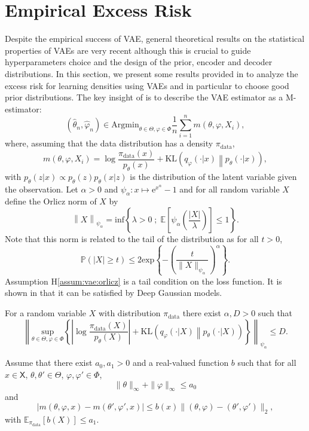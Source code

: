 \documentclass[english,graybox,envcountchap,envcountsame,sectrefs,shortlabels]{svmono}
\theoremstyle{style}
\newcommand{\rme}{\mathrm{e}}
\newcommand{\eqsp}{}
\begin{document}
\section{Empirical Excess Risk}
Despite the empirical success of VAE, general theoretical results on the statistical properties of VAEs are very recent although this is crucial to guide hyperparameters choice and the design of the prior, encoder and decoder distributions. In this section, we present some results provided in \cite{pmlr-v134-tang21a} to analyze the excess risk for learning densities using VAEs and in particular to choose good prior distributions.  The key insight of \cite{pmlr-v134-tang21a} is to describe the VAE estimator as a M-estimator:
$$
(\widehat\theta_n,\widehat\varphi_n) \in\mathrm{Argmin}_{\theta\in\Theta,\varphi\in\Phi} \frac{1}{n}\sum_{i=1}^n m(\theta,\varphi,X_i)\eqsp,
$$
where, assuming that the data distribution has a density $\pi_{\mathrm{data}}$, 
$$
m(\theta,\varphi,X_i) = \log \frac{\pi_{\mathrm{data}}(x)}{p_\theta(x)} + \mathrm{KL}\left(q_\varphi(\cdot|x)\middle\|p_\theta(\cdot|x)\right)\eqsp,
$$
with $p_\theta(z|x) \propto p_\theta(z)p_\theta(x|z)$ is the distribution of the latent variable given the observation. Let $\alpha>0$ and $\psi_\alpha: x\mapsto \rme^{x^\alpha}-1$ and for all random variable $X$ define the Orlicz norm of $X$ by
$$
\left\|X\right\|_{\psi_{\alpha}} = \mathrm{inf}\left\{\lambda >0\;;\; \mathbb{E}\left[\psi_\alpha\left(\frac{|X|}{\lambda}\right)\right]\leqslant 1\right\}\eqsp.
$$
Note that this norm is related to the tail of the distribution as for all $t>0$,
$$
\mathbb{P}\left(|X|\geqslant t\right)\leqslant 2\mathrm{exp}\left\{-\left(\frac{t}{\|X\|_{\psi_{\alpha}}}\right)^\alpha\right\}\eqsp.
$$ 
Assumption H\ref{assum:vae:orlicz} is a tail condition on the loss function. It is shown in \cite{pmlr-v134-tang21a} that it can be satisfied by Deep Gaussian models.
\begin{hypH}
\label{assum:vae:orlicz}
For a random variable $X$  with distribution $\pi_{\mathrm{data}}$ there exist $\alpha,D >0$ such that
$$
\left\|\underset{\theta\in\Theta,\varphi\in\Phi}{\mathrm{sup}} \left\{\left|\log \frac{\pi_{\mathrm{data}}(X)}{p_\theta(X)}\right| + \mathrm{KL}\left(q_\varphi(\cdot|X)\middle\|p_\theta(\cdot|X)\right)\right\}\right\|_{\psi_\alpha} \leqslant D\eqsp.
$$
\end{hypH}

\begin{hypH}
\label{assum:vae:lip}
Assume that there exist $a_0, a_1 >0$ and a real-valued function $b$ such that for all $x\in\mathsf{X}$, $\theta,\theta'\in\Theta$, $\varphi,\varphi'\in\Phi$,
$$
\|\theta\|_\infty + \|\varphi\|_\infty \leqslant a_0
$$
and
$$
\left|m(\theta,\varphi,x) - m(\theta',\varphi',x) \right| \leqslant b(x) \|(\theta,\varphi)-(\theta',\varphi')\|_2\eqsp,
$$
with $\mathbb{E}_{\pi_{\mathrm{data}}}[b(X)]\leqslant a_1$.
\end{hypH}
\end{document}
